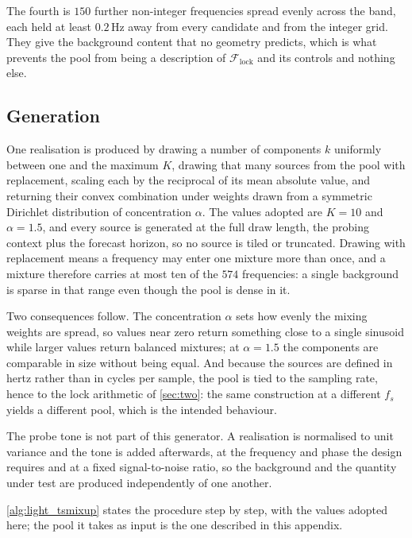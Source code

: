 The fourth is $150$ further non-integer frequencies spread evenly across the band, each held at least $0.2$\,Hz away from every candidate and from the integer grid. They give the background content that no geometry predicts, which is what prevents the pool from being a description of $\mathcal F_{\mathrm{lock}}$ and its controls and nothing else.

\subsection{Generation}

One realisation is produced by drawing a number of components $k$ uniformly between one and the maximum $K$, drawing that many sources from the pool with replacement, scaling each by the reciprocal of its mean absolute value, and returning their convex combination under weights drawn from a symmetric Dirichlet distribution of concentration $\alpha$. The values adopted are $K=10$ and $\alpha=1.5$, and every source is generated at the full draw length, the probing context plus the forecast horizon, so no source is tiled or truncated. Drawing with replacement means a frequency may enter one mixture more than once, and a mixture therefore carries at most ten of the $574$ frequencies: a single background is sparse in that range even though the pool is dense in it.

Two consequences follow. The concentration $\alpha$ sets how evenly the mixing weights are spread, so values near zero return something close to a single sinusoid while larger values return balanced mixtures; at $\alpha=1.5$ the components are comparable in size without being equal. And because the sources are defined in hertz rather than in cycles per sample, the pool is tied to the sampling rate, hence to the lock arithmetic of \autoref{sec:two}: the same construction at a different $f_s$ yields a different pool, which is the intended behaviour.

The probe tone is not part of this generator. A realisation is normalised to unit variance and the tone is added afterwards, at the frequency and phase the design requires and at a fixed signal-to-noise ratio, so the background and the quantity under test are produced independently of one another.

\autoref{alg:light_tsmixup} states the procedure step by step, with the values adopted here; the pool it takes as input is the one described in this appendix.